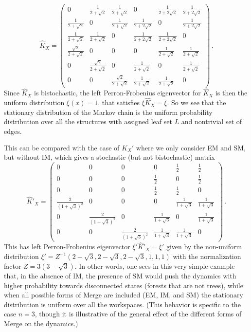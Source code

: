 \documentclass[12pt]{amsart}
\numberwithin{equation}{section}
\begin{document}
\begin{equation}\label{bistohatKX} \hat K_X =  \begin{pmatrix}
0 & \frac{1}{2+\sqrt{2}} & \frac{1}{2+\sqrt{2}} & 0 & \frac{1}{2+2\sqrt{2}} & \frac{1}{2+2\sqrt{2}} \\
\frac{1}{2+\sqrt{2}} & 0 & \frac{1}{2+\sqrt{2}} & \frac{1}{2+2\sqrt{2}} & 0 & \frac{1}{2+2\sqrt{2}} \\
\frac{1}{2+\sqrt{2}} & \frac{1}{2+\sqrt{2}} & 0 & \frac{1}{2+2\sqrt{2}} & \frac{1}{2+2\sqrt{2}} & 0 \\
\frac{\sqrt{2}}{2+\sqrt{2}} & 0 & 0 & 0 & \frac{1}{2+\sqrt{2}}  & \frac{1}{2+\sqrt{2}}  \\
0 & \frac{\sqrt{2}}{2+\sqrt{2}} & 0 & \frac{1}{2+\sqrt{2}}  & 0 & \frac{1}{2+\sqrt{2}}  \\
0 & 0 & \frac{\sqrt{2}}{2+\sqrt{2}} & \frac{1}{2+\sqrt{2}}  & \frac{1}{2+\sqrt{2}}  & 0 
\end{pmatrix} \, . 
\end{equation}
Since $\hat K_X$ is bistochastic, the left Perron-Frobenius eigenvector for $\hat K_X$ is then the uniform distribution $\xi(x)=1$, 
that satisfies $\xi \hat K_X =\xi$. So we see that the stationary distribution of the Markov chain is 
the uniform probability distribution over all the structures with assigned leaf set $L$ and nontrivial
set of edges. 

This can be compared with the case of $K_X'$ where we only consider EM and SM, but without IM, which
gives a stochastic (but not bistochastic) matrix
$$ \hat K'_X =  \begin{pmatrix} 
0 & 0 & 0 & 0 & \frac{1}{2} & \frac{1}{2}  \\
0 & 0 & 0 & \frac{1}{2} & 0 & \frac{1}{2}  \\
0 & 0 & 0 & \frac{1}{2} & \frac{1}{2}  & 0  \\
\frac{2}{(1+\sqrt{3})^2} & 0 & 0 & 0 & \frac{1}{1+\sqrt{3}} &  \frac{1}{1+\sqrt{3}}  \\
0 & \frac{2}{(1+\sqrt{3})^2} & 0 & \frac{1}{1+\sqrt{3}} & 0 &  \frac{1}{1+\sqrt{3}} \\
0 & 0 & \frac{2}{(1+\sqrt{3})^2} & \frac{1}{1+\sqrt{3}} &  \frac{1}{1+\sqrt{3}} & 0 
\end{pmatrix} \, . $$
This has left Perron-Frobenius eigenvector  $\xi'  \hat K'_X=\xi'$
given by the non-uniform distribution 
$\xi'=Z^{-1} (2-\sqrt{3},2-\sqrt{3},2-\sqrt{3},1,1,1)$ with the
normalization factor $Z=3(3-\sqrt{3})$. 
In other words, one sees in this very simple example that, in the absence
of IM, the presence of SM would push the dynamics with higher probability towards disconnected states
(forests that are not trees), while when all possible forms of Merge are included (EM, IM, and SM) the
stationary distribution is uniform over all the workspaces. (This behavior is specific to the case $n=3$,
though it is illustrative of the general effect of the different forms of Merge on the dynamics.)
\end{document}
